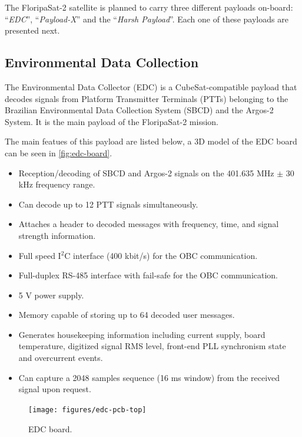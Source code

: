 The FloripaSat-2 satellite is planned to carry three different payloads on-board: ``\textit{EDC}'', ``\textit{Payload-X}'' and the ``\textit{Harsh Payload}''. Each one of these payloads are presented next.

\subsection{Environmental Data Collection}

The Environmental Data Collector (EDC) is a CubeSat-compatible payload that decodes signals from Platform Transmitter Terminals (PTTs) belonging to the Brazilian Environmental Data Collection System (SBCD) and the Argos-2 System. It is the main payload of the FloripaSat-2 mission.

The main featues of this payload are listed below, a 3D model of the EDC board can be seen in \autoref{fig:edc-board}.

\begin{itemize}
    \item Reception/decoding of SBCD and Argos-2 signals on the 401.635 MHz $\pm$ 30 kHz frequency range.
    \item Can decode up to 12 PTT signals simultaneously.
    \item Attaches a header to decoded messages with frequency, time, and signal strength information.
    \item Full speed I$^{2}$C interface (400 kbit/s) for the OBC communication.
    \item Full-duplex RS-485 interface with fail-safe for the OBC communication.
    \item 5 V power supply.
    \item Memory capable of storing up to 64 decoded user messages.
    \item Generates housekeeping information including current supply, board temperature, digitized signal RMS level, front-end PLL synchronism state and overcurrent events.
    \item Can capture a 2048 samples sequence (16 ms window) from the received signal upon request.
\end{itemize}

\begin{figure}[!ht]
    \begin{center}
        \texttt{[image: figures/edc-pcb-top]}
        \caption{EDC board.}
        \label{fig:edc-board}
    \end{center}
\end{figure}

